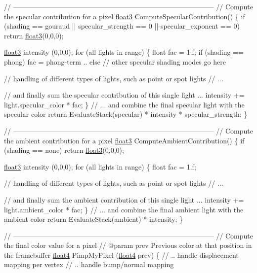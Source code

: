 \begin{DoxyCode}
\textcolor{comment}{// ---------------------------------------------------------------------------------------}
\textcolor{comment}{// Compute the specular contribution for a pixel}
\hyperlink{structfloat3}{float3} ComputeSpecularContribution()
\{
  \textcolor{keywordflow}{if} (shading == gouraud || specular\_strength == 0 || specular\_exponent == 0)
    \textcolor{keywordflow}{return} \hyperlink{structfloat3}{float3}(0,0,0);

  \hyperlink{structfloat3}{float3} intensity (0,0,0);
  \textcolor{keywordflow}{for} (all lights in range)
  \{
    \textcolor{keywordtype}{float} fac = 1.f;
    \textcolor{keywordflow}{if} (shading == phong)
      fac =  phong-term ..
    \textcolor{keywordflow}{else} \textcolor{comment}{// other specular shading modes go here}

    \textcolor{comment}{// handling of different types of lights, such as point or spot lights}
    \textcolor{comment}{// ...}

    \textcolor{comment}{// and finally sum the specular contribution of this single light ...}
    intensity += light.specular\_color * fac;
  \}
  \textcolor{comment}{// ... and combine the final specular light with the specular color}
  \textcolor{keywordflow}{return} EvaluateStack(specular) * intensity * specular\_strength;
\}

\textcolor{comment}{// ---------------------------------------------------------------------------------------}
\textcolor{comment}{// Compute the ambient contribution for a pixel}
\hyperlink{structfloat3}{float3} ComputeAmbientContribution()
\{
  \textcolor{keywordflow}{if} (shading == none)
     \textcolor{keywordflow}{return} \hyperlink{structfloat3}{float3}(0,0,0);

  \hyperlink{structfloat3}{float3} intensity (0,0,0);
  \textcolor{keywordflow}{for} (all lights in range)
  \{
    \textcolor{keywordtype}{float} fac = 1.f;

    \textcolor{comment}{// handling of different types of lights, such as point or spot lights}
    \textcolor{comment}{// ...}

    \textcolor{comment}{// and finally sum the ambient contribution of this single light ...}
    intensity += light.ambient\_color * fac;
  \}
  \textcolor{comment}{// ... and combine the final ambient light with the ambient color}
  \textcolor{keywordflow}{return} EvaluateStack(ambient) * intensity;
\}

\textcolor{comment}{// ---------------------------------------------------------------------------------------}
\textcolor{comment}{// Compute the final color value for a pixel}
\textcolor{comment}{// @param prev Previous color at that position in the framebuffer}
\hyperlink{structfloat4}{float4} PimpMyPixel (\hyperlink{structfloat4}{float4} prev)
\{
  \textcolor{comment}{// .. handle displacement mapping per vertex}
  \textcolor{comment}{// .. handle bump/normal mapping}


\end{DoxyCode}
